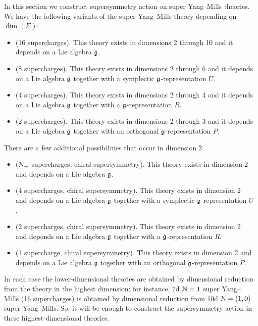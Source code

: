 \documentclass[10pt, oneside]{article}
\begin{document}
In this section we construct supersymmetry action on super Yang--Mills theories. We have the following variants of the super Yang--Mills theory depending on $\dim(\Sigma)$:
\begin{itemize}
\item (16 supercharges). This theory exists in dimensions 2 through 10 and it depends on a Lie algebra $\mathfrak g$.

\item (8 supercharges). This theory exists in dimensions 2 through 6 and it depends on a Lie algebra $\mathfrak g$ together with a symplectic $\mathfrak g$-representation $U$.

\item (4 supercharges). This theory exists in dimensions 2 through 4 and it depends on a Lie algebra $\mathfrak g$ together with a $\mathfrak g$-representation $R$.

\item (2 supercharges). This theory exists in dimensions 2 through 3 and it depends on a Lie algebra $\mathfrak g$ together with an orthogonal $\mathfrak g$-representation $P$.
\end{itemize}

There are a few additional possibilities that occur in dimension 2.

\begin{itemize}
\item ($\mathcal N_+$ supercharges, chiral supersymmetry). This theory exists in dimension 2 and depends on a Lie algebra $\mathfrak g$.

\item (4 supercharges, chiral supersymmetry). This theory exists in dimension 2 and depends on a Lie algebra $\mathfrak g$ together with a symplectic $\mathfrak g$-representation $U$.

\item (2 supercharges, chiral supersymmetry). This theory exists in dimension 2 and depends on a Lie algebra $\mathfrak g$ together with a $\mathfrak g$-representation $R$.

\item (1 supercharge, chiral supersymmetry). This theory exists in dimension 2 and depends on a Lie algebra $\mathfrak g$ together with an orthogonal $\mathfrak g$-representation $P$.
\end{itemize}

In each case the lower-dimensional theories are obtained by dimensional reduction from the theory in the highest dimension: for instance, 7d $\mathcal{N}=1$ super Yang--Mills (16 supercharges) is obtained by dimensional reduction from 10d $\mathcal{N}=(1, 0)$ super Yang--Mills. So, it will be enough to construct the supersymmetry action in these highest-dimensional theories.
\end{document}
